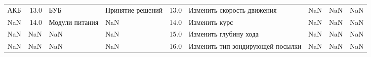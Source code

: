 \begin{longtable}{lrllrllrl}
                                   АКБ &        13.0 &                                          БУБ &                         Принятие решений &        13.0 &        Изменить скорость движения &                                       NaN &         NaN &                                   NaN \\
                                   NaN &        14.0 &                               Модули питания &                                      NaN &        14.0 &                     Изменить курс &                                       NaN &         NaN &                                   NaN \\
                                   NaN &         NaN &                                          NaN &                                      NaN &        15.0 &             Изменить глубину хода &                                       NaN &         NaN &                                   NaN \\
                                   NaN &         NaN &                                          NaN &                                      NaN &        16.0 &  Изменить тип зондирующей посылки &                                       NaN &         NaN &                                   NaN \\
\end{longtable}
